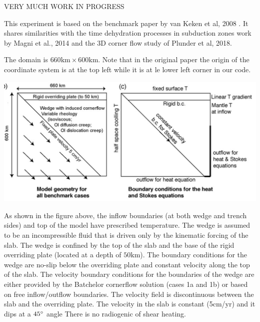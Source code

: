 {VERY MUCH WORK IN PROGRESS}


This experiment is based on the benchmark paper by van Keken et al, 2008 \cite{vack08}.
It shares similarities with the 
time dehydration processes in subduction zones work by Magni et al., 2014 \cite{mabv14} and 
the 3D corner flow study of Plunder et al, 2018\cite{pltv18}.

The domain is $660\text{km}\times 600\text{km}$. Note that in the original paper the 
origin of the coordinate system is at the top left while it is at le lower left corner 
in our code.

\begin{center}
\includegraphics[width=14cm]{python_codes/fieldstone_45/images/setup1}
\end{center}

As shown in the figure above, 
the inflow boundaries (at both wedge and trench sides) and top of the model 
have prescribed temperature. The wedge is assumed to be an incompressible fluid that
is driven only by the kinematic forcing of the slab. The wedge is
confined by the top of the slab and the base of the rigid overriding
plate (located at a depth of $50\text{km}$). 
The boundary conditions for the wedge are no-slip below the overriding plate and constant velocity
along the top of the slab. The velocity boundary conditions for the
boundaries of the wedge are either provided by the Batchelor cornerflow 
solution (cases 1a and 1b) or based on free inflow/outflow
boundaries. The velocity field is discontinuous between the slab
and the overriding plate.
The velocity in the slab is constant (5cm/yr) and it dips at a $45\degree$ angle
There is no radiogenic of shear heating.


